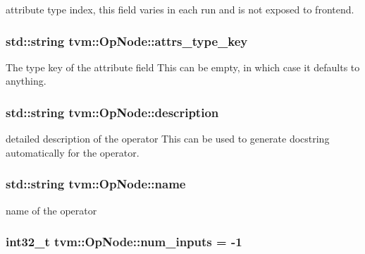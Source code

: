 attribute type index, this field varies in each run and is not exposed to frontend. 

\subsubsection[{\texorpdfstring{attrs\+\_\+type\+\_\+key}{attrs_type_key}}]{\setlength{\rightskip}{0pt plus 5cm}std\+::string tvm\+::\+Op\+Node\+::attrs\+\_\+type\+\_\+key}\hypertarget{classtvm_1_1OpNode_aedeeca81655fb2bba9e1de79dcd539d1}{}\label{classtvm_1_1OpNode_aedeeca81655fb2bba9e1de79dcd539d1}


The type key of the attribute field This can be empty, in which case it defaults to anything. 

\subsubsection[{\texorpdfstring{description}{description}}]{\setlength{\rightskip}{0pt plus 5cm}std\+::string tvm\+::\+Op\+Node\+::description}\hypertarget{classtvm_1_1OpNode_a95d402556bd6c710a0b38f50c8e5e3bc}{}\label{classtvm_1_1OpNode_a95d402556bd6c710a0b38f50c8e5e3bc}


detailed description of the operator This can be used to generate docstring automatically for the operator. 

\subsubsection[{\texorpdfstring{name}{name}}]{\setlength{\rightskip}{0pt plus 5cm}std\+::string tvm\+::\+Op\+Node\+::name}\hypertarget{classtvm_1_1OpNode_ae8810815c68a55b8b6ab00dfb7d7778d}{}\label{classtvm_1_1OpNode_ae8810815c68a55b8b6ab00dfb7d7778d}


name of the operator 

\subsubsection[{\texorpdfstring{num\+\_\+inputs}{num_inputs}}]{\setlength{\rightskip}{0pt plus 5cm}int32\+\_\+t tvm\+::\+Op\+Node\+::num\+\_\+inputs = -\/1}\hypertarget{classtvm_1_1OpNode_aa13505588162bc5448bd03f02f5c545b}{}\label{classtvm_1_1OpNode_aa13505588162bc5448bd03f02f5c545b}


